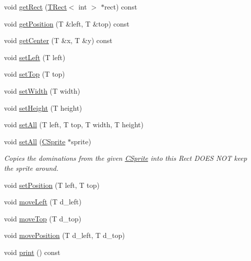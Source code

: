 \begin{DoxyCompactItemize}
\item 
void \hyperlink{classengine_1_1TRect_a9b563983bf2839c51db741cdd0b90058}{get\-Rect} (\hyperlink{classengine_1_1TRect}{T\-Rect}$<$ int $>$ $\ast$rect) const 
\item 
void \hyperlink{classengine_1_1TRect_a6ec7dc08118c6012d17327ca8934d2e0}{get\-Position} (T \&left, T \&top) const 
\item 
void \hyperlink{classengine_1_1TRect_a34c390356af6890b4d4a5ef3d19694cf}{get\-Center} (T \&x, T \&y) const 
\item 
void \hyperlink{classengine_1_1TRect_aa0f1c4e8042c553fb3a9ad0805a58bb3}{set\-Left} (T left)
\item 
void \hyperlink{classengine_1_1TRect_aca4664e0e6d9736ffbc48663f9e8cd3f}{set\-Top} (T top)
\item 
void \hyperlink{classengine_1_1TRect_aad5a2530169d7953634fea4515381c37}{set\-Width} (T width)
\item 
void \hyperlink{classengine_1_1TRect_ae29fe9d2401f49e84f6c070ef60e9d7b}{set\-Height} (T height)
\item 
void \hyperlink{classengine_1_1TRect_ae10bacc96b54c45b2722e51b045ae3fe}{set\-All} (T left, T top, T width, T height)
\item 
void \hyperlink{classengine_1_1TRect_a41cce51fffc829c4d3e5dc40f605cb9e}{set\-All} (\hyperlink{classengine_1_1CSprite}{C\-Sprite} $\ast$sprite)
\begin{DoxyCompactList}\small\item\em Copies the dominations from the given \hyperlink{classengine_1_1CSprite}{C\-Sprite} into this Rect D\-O\-E\-S N\-O\-T keep the sprite around. \end{DoxyCompactList}\item 
void \hyperlink{classengine_1_1TRect_ad7bdff230a7152e3d8ed3934046bed7c}{set\-Position} (T left, T top)
\item 
void \hyperlink{classengine_1_1TRect_a0699fb896f494a85e24abe32066ae5d9}{move\-Left} (T d\-\_\-left)
\item 
void \hyperlink{classengine_1_1TRect_a7e65ccfa166f4d7690d87e6985182379}{move\-Top} (T d\-\_\-top)
\item 
void \hyperlink{classengine_1_1TRect_a2650390138117e0ad1eecc8124735bd9}{move\-Position} (T d\-\_\-left, T d\-\_\-top)
\item 
void \hyperlink{classengine_1_1TRect_af15d2e6daff9f908dbd3d486d2349883}{print} () const 
\end{DoxyCompactItemize}



